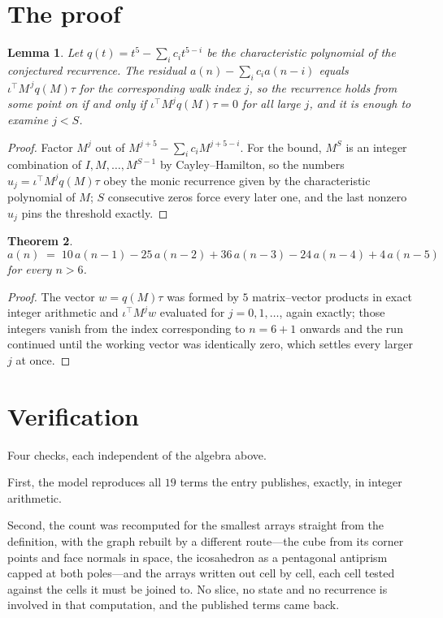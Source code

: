 \documentclass[11pt,a4paper]{article}
\theoremstyle{plain}
\newtheorem{theorem}{Theorem}
\newtheorem{lemma}[theorem]{Lemma}
\theoremstyle{definition}
\begin{document}
\section{The proof}

\begin{lemma}\label{lem:crit}
Let $q(t)=t^{5}-\sum_i c_it^{5-i}$ be the characteristic polynomial of the
conjectured recurrence. The residual $a(n)-\sum_ic_ia(n-i)$ equals
$\iota^{\!\top}M^{\,j}q(M)\tau$ for the corresponding walk index $j$, so the recurrence
holds from some point on if and only if $\iota^{\!\top}M^{j}q(M)\tau=0$ for all large $j$,
and it is enough to examine $j<S$.
\end{lemma}

\begin{proof}
Factor $M^{j}$ out of $M^{j+5}-\sum_ic_iM^{j+5-i}$. For the bound, $M^{S}$
is an integer combination of $I,M,\dots,M^{S-1}$ by Cayley--Hamilton, so the numbers
$u_j=\iota^{\!\top}M^{j}q(M)\tau$ obey the monic recurrence given by the characteristic
polynomial of $M$; $S$ consecutive zeros force every later one, and the last nonzero $u_j$
pins the threshold exactly.
\end{proof}

\begin{theorem}
\[
a(n)\;=\;10\,a(n-1) - 25\,a(n-2) + 36\,a(n-3) - 24\,a(n-4) + 4\,a(n-5)
\]
for every $n>6$.
\end{theorem}

\begin{proof}
The vector $w=q(M)\tau$ was formed by $5$ matrix--vector products in exact integer
arithmetic and $\iota^{\!\top}M^{j}w$ evaluated for $j=0,1,\dots$, again exactly; those
integers vanish from the index corresponding to $n=6+1$ onwards and the run continued
until the working vector was identically zero, which settles every larger $j$ at once.
\end{proof}

\section{Verification}

Four checks, each independent of the algebra above.

First, the model reproduces all $19$ terms the entry publishes, exactly, in integer
arithmetic.

Second, the count was recomputed for the smallest arrays straight from the definition, with the
graph rebuilt by a different route---the cube from its corner points and face normals in space,
the icosahedron as a pentagonal antiprism capped at both poles---and the arrays written out cell
by cell, each cell tested against the cells it must be joined to. No slice, no state and no
recurrence is involved in that computation, and the published terms came back.
\end{document}

